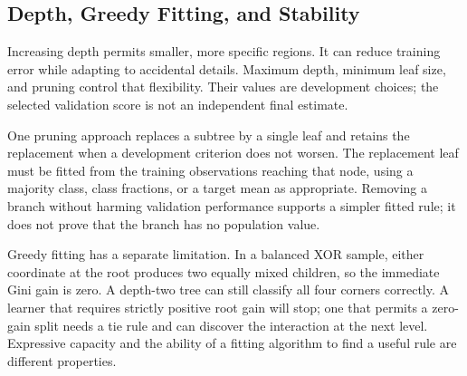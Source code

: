 \subsection{Depth, Greedy Fitting, and Stability}

Increasing depth permits smaller, more specific regions. It can reduce training error while adapting to accidental details. Maximum depth, minimum leaf size, and pruning control that flexibility. Their values are development choices; the selected validation score is not an independent final estimate.

\par\addvspace{\intextsep}\noindent\begin{minipage}{\linewidth}
\centering
{}
\label{fig:tree-depth-curves}
\end{minipage}\par\addvspace{\intextsep}

One pruning approach replaces a subtree by a single leaf and retains the replacement when a development criterion does not worsen. The replacement leaf must be fitted from the training observations reaching that node, using a majority class, class fractions, or a target mean as appropriate. Removing a branch without harming validation performance supports a simpler fitted rule; it does not prove that the branch has no population value.

Greedy fitting has a separate limitation. In a balanced XOR sample, either coordinate at the root produces two equally mixed children, so the immediate Gini gain is zero. A depth-two tree can still classify all four corners correctly. A learner that requires strictly positive root gain will stop; one that permits a zero-gain split needs a tie rule and can discover the interaction at the next level. Expressive capacity and the ability of a fitting algorithm to find a useful rule are different properties.

